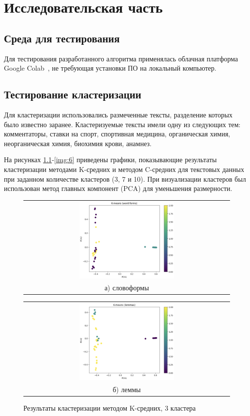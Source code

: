 \chapter{Исследовательская часть}

\section{Среда для тестирования}

Для тестирования разработанного алгоритма применялась облачная платформа Google Colab~\cite{colab}, не требующая установки ПО на локальный компьютер.

% 

\section{Тестирование кластеризации}

Для кластеризации использовались размеченные тексты, разделение которых было известно заранее. Кластеризуемые тексты имели одну из следующих тем: комментаторы, ставки на спорт, спортивная медицина, органическая химия, неорганическая химия, биохимия крови, анамнез.

На рисунках \ref{img:1}-\ref{img:6} приведены графики, показывающие результаты кластеризации методами K-средних и методом C-средних для текстовых данных при заданном количестве кластеров (3, 7 и 10). При визуализации кластеров был использован метод главных компонент (PCA) для уменьшения размерности.

\begin{figure}
	\begin{tabular}[b]{c}
		\includegraphics[width=0.475\textwidth]{images/1.png} \\
		\small а) словоформы
	\end{tabular}
	\begin{tabular}[b]{c}
		\includegraphics[width=0.475\textwidth]{images/2.png} \\
		\small б) леммы
	\end{tabular}
	\caption{Результаты кластеризации методом K-средних, 3 кластера}
	\label{img:1}
\end{figure}

